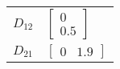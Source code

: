 \begin{tabular}{cl}
 $D_{12}$ & $\left[\begin{matrix}0\\0.5\end{matrix}\right]$                                                                                                                                                                                                                                                                                                                                                                                                                                                 \\
 $D_{21}$ & $\left[\begin{matrix}0 & 1.9\end{matrix}\right]$                                                                                                                                                                                                                                                                                                                                                                                                                                                \\
\hline
\end{tabular}